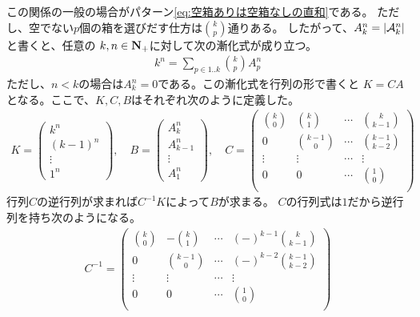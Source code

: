 	この関係の一般の場合がパターン\eqref{eq:空箱ありは空箱なしの直和}である。
	ただし、空でない$p$個の箱を選びだす仕方は$\binom{k}{p}$通りある。
	したがって、$A_k^n=\left|{{\mathcal{A}}_k^n}\right|$と書くと、任意の
	$k,n\in{\mathbf{N}}_+$に対して次の漸化式が成り立つ。
	\begin{equation*}\begin{split} %
		k^n = \sum_{p\in1..k}\binom{k}{p}A_p^n
	\end{split}\end{equation*} %
	ただし、$n<k$の場合は$A_k^n=0$である。この漸化式を行列の形で書くと
	$K = CA$となる。ここで、$K,C,B$はそれぞれ次のように定義した。
	\begin{equation*}\begin{split} %
		K = \begin{pmatrix}
			k^n \\ (k-1)^n \\ \vdots \\ 1^n
		\end{pmatrix} 
		,\quad B = \begin{pmatrix}
			A_k^n \\ A_{k-1}^n \\ \vdots \\ A_1^n
		\end{pmatrix}
		,\quad C = \begin{pmatrix}
			\binom{k}{0} & \binom{k}{1} & \cdots & \binom{k}{k-1} \\
			0 & \binom{k-1}{0} & \cdots & \binom{k-1}{k-2} \\
			\vdots & \vdots & \cdots & \vdots \\
			0 & 0 & \cdots & \binom{1}{0} \\
		\end{pmatrix} 
	\end{split}\end{equation*} %
	行列$C$の逆行列が求まれば$C^{-1}K$によって$B$が求まる。
	$C$の行列式は$1$だから逆行列を持ち次のようになる。
	\begin{equation*}\begin{split} %
		C^{-1} = \begin{pmatrix}
			\binom{k}{0} & -\binom{k}{1} & \cdots & (-)^{k-1}\binom{k}{k-1} \\
			0 & \binom{k-1}{0} & \cdots & (-)^{k-2}\binom{k-1}{k-2} \\
			\vdots & \vdots & \cdots & \vdots \\
			0 & 0 & \cdots & \binom{1}{0} \\
		\end{pmatrix}
	\end{split}\end{equation*} %
